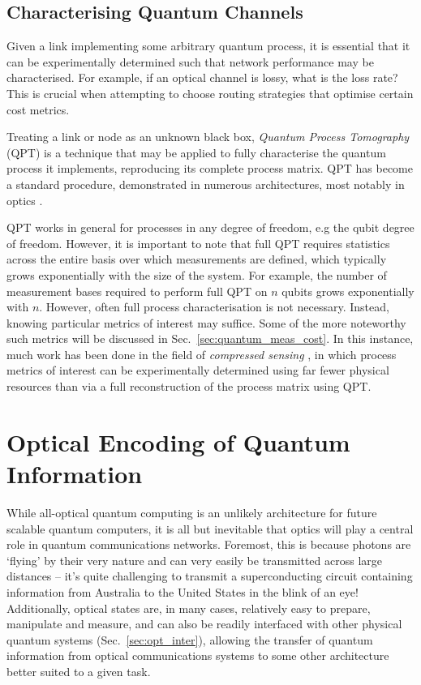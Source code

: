 \documentclass[aps,rmp,twocolumn,amsmath,amssymb,nofootinbib,superscriptaddress]{revtex4}
\begin{document}
%
%

\subsection{Characterising Quantum Channels}

Given a link implementing some arbitrary quantum process, it is essential that it can be experimentally determined such that network performance may be characterised. For example, if an optical channel is lossy, what is the loss rate? This is crucial when attempting to choose routing strategies that optimise certain cost metrics.

Treating a link or node as an unknown black box, \emph{Quantum Process Tomography} (QPT) \cite{???, bib:ChuangNielsen97} is a technique that may be applied to fully characterise the quantum process it implements, reproducing its complete process matrix. QPT has become a standard procedure, demonstrated in numerous architectures, most notably in optics \cite{???, bib:OBrien04}.

QPT works in general for processes in any degree of freedom, e.g the qubit degree of freedom. However, it is important to note that full QPT requires statistics across the entire basis over which measurements are defined, which typically grows exponentially with the size of the system. For example, the number of measurement bases required to perform full QPT on $n$ qubits grows exponentially with $n$. However, often full process characterisation is not necessary. Instead, knowing particular metrics of interest may suffice. Some of the more noteworthy such metrics will be discussed in Sec.~\ref{sec:quantum_meas_cost}. In this instance, much work has been done in the field of \emph{compressed sensing} \cite{??? compressed_sensing}, in which process metrics of interest can be experimentally determined using far fewer physical resources than via a full reconstruction of the process matrix using QPT.

%
%

\section{Optical Encoding of Quantum Information}

While all-optical quantum computing is an unlikely architecture for future scalable quantum computers, it is all but inevitable that optics will play a central role in quantum communications networks. Foremost, this is because photons are `flying' by their very nature and can very easily be transmitted across large distances -- it's quite challenging to transmit a superconducting circuit containing information from Australia to the United States in the blink of an eye! Additionally, optical states are, in many cases, relatively easy to prepare, manipulate and measure, and can also be readily interfaced with other physical quantum systems (Sec.~\ref{sec:opt_inter}), allowing the transfer of quantum information from optical communications systems to some other architecture better suited to a given task.
\end{document}

